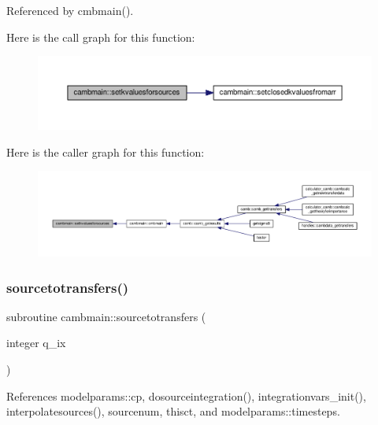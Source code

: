 Referenced by cmbmain().

Here is the call graph for this function\+:
\nopagebreak
\begin{figure}[H]
\begin{center}
\leavevmode
\includegraphics[width=350pt]{namespacecambmain_a63fe5ba29fa3c5116ef8bc646e7aa09c_cgraph}
\end{center}
\end{figure}
Here is the caller graph for this function\+:
\nopagebreak
\begin{figure}[H]
\begin{center}
\leavevmode
\includegraphics[width=350pt]{namespacecambmain_a63fe5ba29fa3c5116ef8bc646e7aa09c_icgraph}
\end{center}
\end{figure}
\mbox{\label{namespacecambmain_ad84747dc28d2ff66a818a46c3eb5f574}} 
\subsubsection{\texorpdfstring{sourcetotransfers()}{sourcetotransfers()}}
{\footnotesize\ttfamily subroutine cambmain\+::sourcetotransfers (\begin{DoxyParamCaption}\item[{integer}]{q\+\_\+ix }\end{DoxyParamCaption})\hspace{0.3cm}{\ttfamily [private]}}



References modelparams\+::cp, dosourceintegration(), integrationvars\+\_\+init(), interpolatesources(), sourcenum, thisct, and modelparams\+::timesteps.




